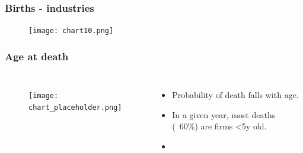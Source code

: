 \documentclass{beamer}
\begin{document}
\begin{frame}
\frametitle{Births - industries}





\begin{figure}
\centering
\texttt{[image: chart10.png]}
\end{figure}


\end{frame}


\begin{frame}
\frametitle{Age at death}

\begin{columns}


\begin{figure}
\centering
\texttt{[image: chart\_placeholder.png]}
\end{figure}


\begin{itemize}
\item Probability of death falls with age.
\item In a given year, most deaths (~60\%) are firms <5y old.
\item \href{https://www.rapidcharts.io/productivity}{}
\end{itemize}


\end{columns}
\end{frame}
\end{document}
